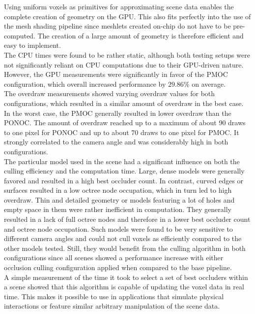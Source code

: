 \noindent
Using uniform voxels as primitives for approximating scene data enables the complete creation of geometry on the 
\ac{GPU}. This also fits perfectly into the use of the mesh shading pipeline since meshlets created on-chip do 
not have to be pre-computed. The creation of a large amount of geometry is therefore efficient and easy to 
implement. \\

\noindent
The \ac{CPU} times were found to be rather static, although both testing setups were not significantly reliant 
on \ac{CPU} computations due to their \ac{GPU}-driven nature. However, the \ac{GPU} measurements were significantly 
in favor of the \ac{PMOC} configuration, which overall increased performance by $29.86\%$ on average. \\

\noindent
The overdraw measurements showed varying overdraw values for both configurations, which resulted in a similar amount 
of overdraw in the best case. In the worst case, the \ac{PMOC} generally resulted in lower overdraw than 
the \ac{PONOC}. The amount of overdraw reached up to a maximum of about 90 draws to one pixel for 
\ac{PONOC} and up to about 70 draws to one pixel for \ac{PMOC}. It strongly correlated to the 
camera angle and was considerably high in both configurations. \\ 

\noindent
The particular model used in the scene had a significant influence on both the culling efficiency and the computation 
time. Large, dense models were generally favored and resulted in a high best occluder count. In contrast, curved edges 
or surfaces resulted in a low octree node occupation, which in turn led to high overdraw. Thin and detailed geometry 
or models featuring a lot of holes and empty space in them were rather inefficient in computation. They generally 
resulted in a lack of full octree nodes and therefore in a lower best occluder count and octree node occupation. Such 
models were found to be very sensitive to different camera angles and could not cull voxels as efficiently compared 
to the other models tested. Still, they would benefit from the culling algorithm in both configurations since all 
scenes showed a performance increase with either occlusion culling configuration applied when compared to the base 
pipeline. \\

\noindent
A simple measurement of the time it took to select a set of best occluders within a scene showed that this algorithm 
is capable of updating the voxel data in real time. This makes it possible to use in applications that simulate physical 
interactions or feature similar arbitrary manipulation of the scene data.

